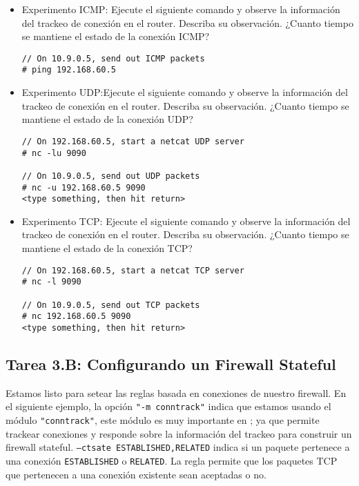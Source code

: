 \begin{itemize}
\item Experimento ICMP: Ejecute el siguiente comando y observe la información del trackeo de conexión en el router. Describa su observación. ¿Cuanto tiempo se mantiene el estado de la conexión ICMP?

\begin{lstlisting}
// On 10.9.0.5, send out ICMP packets
# ping 192.168.60.5
\end{lstlisting}

\item Experimento UDP:Ejecute el siguiente comando y observe la información del trackeo de conexión en el router. Describa su observación. ¿Cuanto tiempo se mantiene el estado de la conexión UDP?


\begin{lstlisting}
// On 192.168.60.5, start a netcat UDP server
# nc -lu 9090

// On 10.9.0.5, send out UDP packets  
# nc -u 192.168.60.5 9090
<type something, then hit return>
\end{lstlisting}


\item Experimento TCP: Ejecute el siguiente comando y observe la información del trackeo de conexión en el router. Describa su observación. ¿Cuanto tiempo se mantiene el estado de la conexión TCP?

\begin{lstlisting}
// On 192.168.60.5, start a netcat TCP server
# nc -l 9090

// On 10.9.0.5, send out TCP packets 
# nc 192.168.60.5 9090
<type something, then hit return>
\end{lstlisting}

\end{itemize}
 


\subsection{Tarea 3.B: Configurando un Firewall Stateful} 

Estamos listo para setear las reglas basada en conexiones de nuestro firewall.
En el siguiente ejemplo, la opción \texttt{"-m conntrack"} indica que estamos usando el módulo \texttt{"conntrack"},
este módulo es muy importante en \iptables; ya que permite trackear conexiones y \iptables responde sobre la información del trackeo para construir un firewall stateful.
\texttt{--ctsate ESTABLISHED,RELATED} indica si un paquete pertenece a una conexión \texttt{ESTABLISHED} o \texttt{RELATED}.
La regla permite que los paquetes TCP que pertenecen a una conexión existente sean aceptadas o no.

